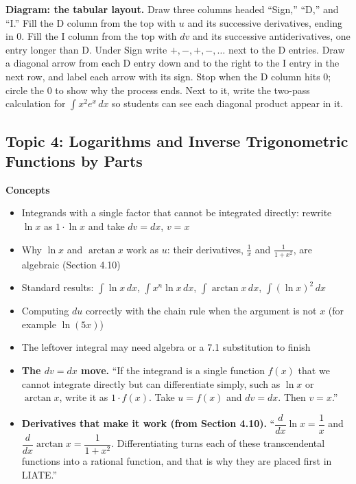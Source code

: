 \documentclass[11pt]{article}
\begin{document}
\begin{notebox}
\textbf{Diagram: the tabular layout.} Draw three columns headed ``Sign,'' ``D,'' and ``I.'' Fill the D column from the top with $u$ and its successive derivatives, ending in $0$. Fill the I column from the top with $dv$ and its successive antiderivatives, one entry longer than D. Under Sign write $+,-,+,-,\dots$ next to the D entries. Draw a diagonal arrow from each D entry down and to the right to the I entry in the next row, and label each arrow with its sign. Stop when the D column hits $0$; circle the $0$ to show why the process ends. Next to it, write the two-pass calculation for $\int x^2e^x\,dx$ so students can see each diagonal product appear in it.
\end{notebox}

\subsection{Topic 4: Logarithms and Inverse Trigonometric Functions by Parts}

\textbf{Concepts}
\begin{itemize}
\item Integrands with a single factor that cannot be integrated directly: rewrite $\ln x$ as $1\cdot\ln x$ and take $dv=dx$, $v=x$
\item Why $\ln x$ and $\arctan x$ work as $u$: their derivatives, $\frac1x$ and $\frac1{1+x^2}$, are algebraic (Section 4.10)
\item Standard results: $\int\ln x\,dx$, $\int x^n\ln x\,dx$, $\int\arctan x\,dx$, $\int(\ln x)^2\,dx$
\item Computing $du$ correctly with the chain rule when the argument is not $x$ (for example $\ln(5x)$)
\item The leftover integral may need algebra or a 7.1 substitution to finish
\end{itemize}

\begin{defbox}
\begin{itemize}
\item \textbf{The $dv=dx$ move.} ``If the integrand is a single function $f(x)$ that we cannot integrate directly but can differentiate simply, such as $\ln x$ or $\arctan x$, write it as $1\cdot f(x)$. Take $u=f(x)$ and $dv=dx$. Then $v=x$.''
\item \textbf{Derivatives that make it work (from Section 4.10).} ``$\dfrac{d}{dx}\ln x = \dfrac1x$ and $\dfrac{d}{dx}\arctan x = \dfrac1{1+x^2}$. Differentiating turns each of these transcendental functions into a rational function, and that is why they are placed first in LIATE.''
\end{itemize}
\end{defbox}
\end{document}
